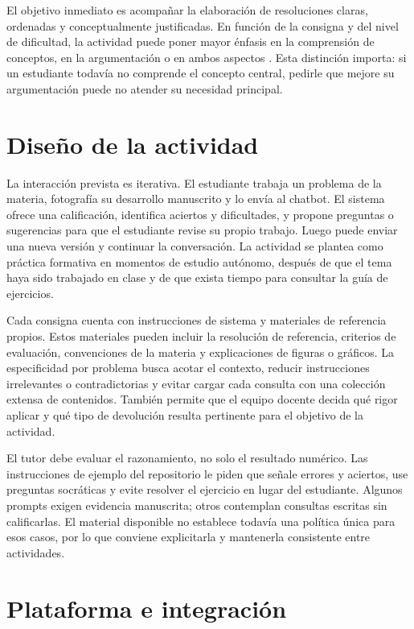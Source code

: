\documentclass[11pt,a4paper]{article}
\begin{document}
El objetivo inmediato es acompañar la elaboración de resoluciones claras, ordenadas y conceptualmente justificadas. En función de la consigna y del nivel de dificultad, la actividad puede poner mayor énfasis en la comprensión de conceptos, en la argumentación o en ambos aspectos \cite{notas}. Esta distinción importa: si un estudiante todavía no comprende el concepto central, pedirle que mejore su argumentación puede no atender su necesidad principal.

\section{Diseño de la actividad}

La interacción prevista es iterativa. El estudiante trabaja un problema de la materia, fotografía su desarrollo manuscrito y lo envía al chatbot. El sistema ofrece una calificación, identifica aciertos y dificultades, y propone preguntas o sugerencias para que el estudiante revise su propio trabajo. Luego puede enviar una nueva versión y continuar la conversación. La actividad se plantea como práctica formativa en momentos de estudio autónomo, después de que el tema haya sido trabajado en clase y de que exista tiempo para consultar la guía de ejercicios.

Cada consigna cuenta con instrucciones de sistema y materiales de referencia propios. Estos materiales pueden incluir la resolución de referencia, criterios de evaluación, convenciones de la materia y explicaciones de figuras o gráficos. La especificidad por problema busca acotar el contexto, reducir instrucciones irrelevantes o contradictorias y evitar cargar cada consulta con una colección extensa de contenidos. También permite que el equipo docente decida qué rigor aplicar y qué tipo de devolución resulta pertinente para el objetivo de la actividad.

El tutor debe evaluar el razonamiento, no solo el resultado numérico. Las instrucciones de ejemplo del repositorio le piden que señale errores y aciertos, use preguntas socráticas y evite resolver el ejercicio en lugar del estudiante. Algunos prompts exigen evidencia manuscrita; otros contemplan consultas escritas sin calificarlas. El material disponible no establece todavía una política única para esos casos, por lo que conviene explicitarla y mantenerla consistente entre actividades.

\section{Plataforma e integración}
\end{document}
